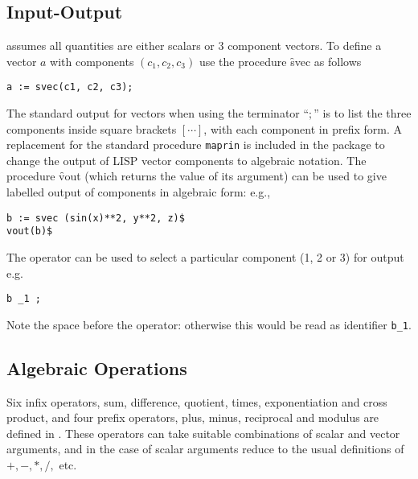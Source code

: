 \subsection{Input-Output}

 assumes all quantities are either scalars or 3 component
vectors.  To define a vector $a$ with components $(c_1, c_2, c_3)$ use
the procedure \f{svec} as follows 
\hypertarget{operator:SVEC}{}
\begin{verbatim}
a := svec(c1, c2, c3);
\end{verbatim}

The standard \REDUCE output for vectors when using the terminator ``$;$''
is to list the three components inside square brackets
$[\cdots]$, with each component in prefix form.  A replacement for the
standard \REDUCE procedure \texttt{maprin} is included in
the package to change the
output of LISP vector components to algebraic notation.  The procedure
 \f{vout} (which returns the value of its argument)
can be used to give labelled output of components
in algebraic form: e.g.,
\begin{verbatim}
b := svec (sin(x)**2, y**2, z)$
vout(b)$
\end{verbatim}

The operator \texttt{\textunderscore} can be used to select a particular
component (1, 2 or 3) for output e.g.
\begin{verbatim}
b _1 ;
\end{verbatim}
Note the space before the \texttt{\textunderscore} operator: otherwise this would be read as identifier \texttt{b\_1}.

\subsection{Algebraic Operations}

Six infix operators, sum, difference, quotient, times, exponentiation
and cross product, and four prefix
operators, plus, minus, reciprocal
and  modulus are defined in .  These operators can take suitable
combinations of scalar and vector arguments,
and in the case of scalar arguments reduce to the usual definitions of
$ +, -, *, /, $ etc.

